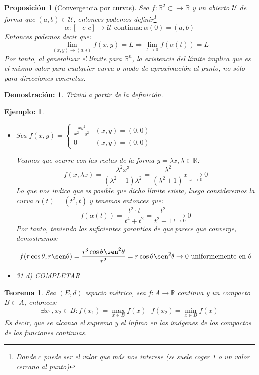 \documentclass[10pt,a4paper,openright]{book}
\theoremstyle{break}
\newtheorem*{theo}{Teorema}
\newtheorem*{prop}{Proposición}
\newtheorem*{demo}{\underline{Demostración}:}
\newtheorem*{ej}{\underline{Ejemplo}:}
\begin{document}
\begin{prop}[Convergencia por curvas]
Sea $f: \mathbb{R}^2 \subset \to \mathbb{R}$ y un abierto $\mathcal{U}$ de forma que $(a,b) \in \mathcal{U}$, entonces podemos definir\footnote{Donde $c$ puede ser el valor que más nos interese (se suele coger 1 o un valor cercano al punto)}
$$\alpha: [-c,c] \to \mathcal{U} \mbox{ continua} : \alpha(0) = (a,b)$$ Entonces podemos decir que:
$$\lim_{(x,y) \to (a,b)} f(x,y) = L\Rightarrow\lim_{t \to 0} f(\alpha(t)) = L$$
Por tanto, al generalizar el límite para $\mathbb{R}^n$, la existencia del límite implica que es el mismo valor para cualquier curva o modo de aproximación al punto, no sólo para direcciones concretas.
\end{prop}
\begin{demo}
Trivial a partir de la definición.
\end{demo}

\begin{ej}
\begin{itemize}
\item Sea $f(x,y) = \begin{cases} \frac{xy^2}{x^2 + y^2} & (x,y) = (0,0) \\ 0 & (x,y) = (0,0) \end{cases}$

Veamos que ocurre con las rectas de la forma $y = \lambda x, \lambda \in \mathbb{R}$:
$$f(x,\lambda x) = \frac{\lambda^2x^3}{(\lambda^2 + 1) \lambda^2} = \frac{\lambda^2}{(\lambda^2 + 1)} x \xrightarrow[x \to 0]{} 0$$
Lo que nos indica que es posible que dicho límite exista, luego consideremos la curva $\alpha(t)= (t^2, t)$ y tenemos entonces que:
$$f(\alpha(t)) = \frac{t^2 \cdot t}{t^4 + t^2} = \frac{t^2}{t^2 + 1} \xrightarrow[t \to 0]{} 0$$
Por tanto, teniendo las suficientes garantías de que parece que converge, demostramos:
$$f(r \cos \theta, r \sen \theta) = \frac{r^3 \cos\theta \sen^2 \theta}{r^2} = r \cos \theta \sen^2 \theta \rightarrow 0 \mbox{ uniformemente en } \theta $$

\item 31 d) COMPLETAR
\end{itemize}
\end{ej}

\begin{theo}
Sea $(E,d)$ espacio métrico, sea $f: A \to \mathbb{R}$ continua y un compacto $B \subset A$, entonces:
$$\exists x_1, x_2 \in B : f(x_1) = \max_{x \in B} f(x) \ \ \ f(x_2) = \min_{x \in B} f(x)$$
Es decir, que se alcanza el supremo y el ínfimo en las imágenes de los compactos de las funciones continuas.
\end{theo}
\end{document}

